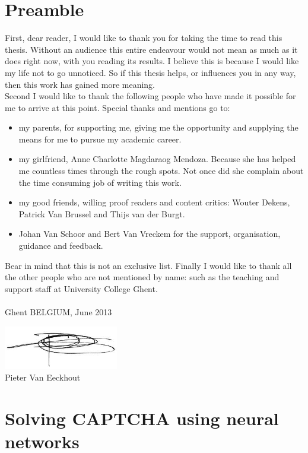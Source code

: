 \documentclass[pdftex,a4paper,12pt,twoside]{report}
\newcommand{\emptypage}{
\newpage
\thispagestyle{empty}
\mbox{}
\newpage
}
\theoremstyle{plain} \newtheorem{theorem}{Theorem} \newtheorem{proposition}{Proposition} \newtheorem{lemma}{Lemma} \newtheorem*{corollary}{Corollary}
\theoremstyle{definition} \newtheorem{definition}{Definition} \newtheorem{conjecture}{Conjecture} \newtheorem*{example}{Example} \newtheorem{algorithm}{Algorithm}
\theoremstyle{remark} \newtheorem*{remark}{Remark} \newtheorem*{note}{Note} \newtheorem{case}{Case}
\newcommand{\captchasp}{CAPTCHA }
\newcommand{\studenta}{Pieter {Van Eeckhout}}
\newcommand{\titel}{Solving \captchasp using neural networks}
\begin{document}
\chapter*{Preamble}
\label{ch:preamble}
First, dear reader, I would like to thank you for taking the time to read this thesis. Without an audience this entire endeavour would not mean as much as it does right now, with you reading its results. I believe this is because I would like my life not to go unnoticed. So if this thesis helps, or influences you in any way, then this work has gained more meaning.\\Second I would like to thank the following people who have made it possible for me to arrive at this point. Special thanks and mentions go to:
\begin{itemize}
\item my parents, for supporting me, giving me the opportunity and supplying the means for me to pursue my academic career.
\item my girlfriend, Anne Charlotte Magdaraog Mendoza. Because she has helped me countless times through the rough spots. Not once did she complain about the time consuming job of writing this work.
\item my good friends, willing proof readers and content critics: Wouter Dekens, Patrick Van Brussel and Thijs van der Burgt.
\item Johan Van Schoor and Bert Van Vreckem for the support, organisation, guidance and feedback.
\end{itemize}
Bear in mind that this is not an exclusive list. Finally I would like to thank all the other people who are not mentioned by name: such as the teaching and support staff at University College Ghent.\\\\Ghent BELGIUM, June 2013
\begin{center}
\includegraphics[width=5cm]{./img/signature.png}\\[.5cm]
\studenta
\end{center}

\emptypage

\chapter{\titel}
\label{ch:introduction}
\end{document}
